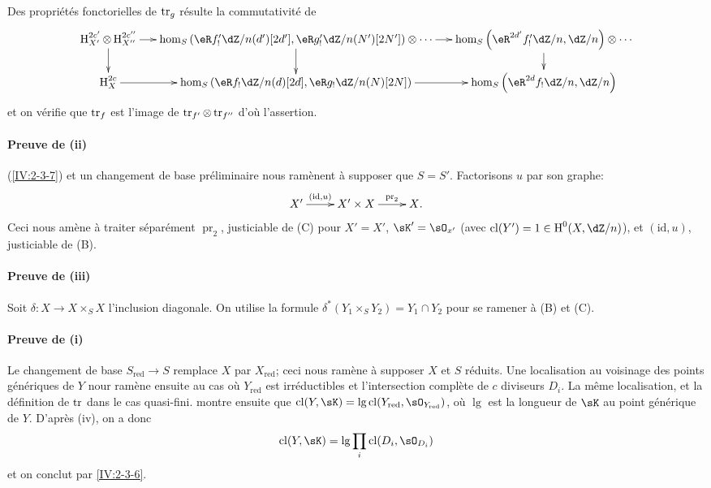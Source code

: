 Des propriétés fonctorielles de $\operatorname{tr}_g$ \cite[XVIII.2.12]{sga4} résulte 
la commutativité de 
\small
\[\xymatrix@=0.5cm{
  \h_{X'}^{2c'}\otimes \h_{X''}^{2 c''}\ar[r] \ar[d] 
    & \hom_S\left(\eR f_!' \dZ/n(d')[2 d'],\eR g_!'\dZ/n(N')[2 N']\right)\otimes \cdots \ar[r] \ar[d] 
    & \hom_S\left(\eR^{2 d'} f_!' \dZ/n,\dZ/n\right) \otimes \cdots \ar[d] \\
  \h_X^{2 c} \ar[r] 
    & \hom_S\left(\eR f_!\dZ/n(d)[2 d],\eR g_!\dZ/n(N)[2 N]\right) \ar[r] 
    & \hom_S\left(\eR^{2 d}f_!\dZ/n,\dZ/n\right)
}\]
\normalsize
et on vérifie que $\operatorname{tr}_f$ est l'image de $\operatorname{tr}_{f'}\otimes \operatorname{tr}_{f''}$ d'où 
l'assertion. 

\paragraph{Preuve de (ii)}
(\ref{IV:2-3-7}) et un changement de base préliminaire nous ramènent à 
supposer que $S=S'$. Factorisons $u$ par son graphe:
\[\xymatrix{
  X' \ar[r]^-{(\text{id},u)} 
    & X'\times X \ar[r]^-{\operatorname{pr}_2} 
    & X \text{.}
}\]
Ceci nous amène à traiter séparément $\operatorname{pr}_2$, justiciable 
de (C) pour $X'=X'$, $\sK'=\sO_{x'}$ (avec $\cl(Y')=1\in \h^0(X,\dZ/n)$), et 
$(\text{id},u)$, justiciable de (B). 

\paragraph{Preuve de (iii)}
Soit $\delta:X\to X\times_S X$ l'inclusion diagonale. On utilise la formule 
$\delta^\ast(Y_1\times_S Y_2) = Y_1\cap Y_2$ pour se ramener à 
(B) et (C). 

\paragraph{Preuve de (i)}
Le changement de base $S_\text{red}\to S$ remplace $X$ par $X_\text{red}$; ceci 
nous ramène à supposer $X$ et $S$ réduits. Une localisation au voisinage 
des points génériques de $Y$ nour ramène ensuite au cas où 
$Y_\text{red}$ est irréductibles et l'intersection complète de $c$ 
diviseurs $D_i$. La même localisation, et la définition de $\operatorname{tr}$ dans le 
cas quasi-fini. montre ensuite que 
$\cl(Y,\sK)=\operatorname{lg}\cl(Y_\text{red},\sO_{Y_\text{red}})$, où 
$\operatorname{lg}$ est la longueur de $\sK$ au point générique de $Y$. 
D'après (iv), on a donc 
\[
  \cl(Y,\sK) = \operatorname{lg} \prod_i \cl(D_i,\sO_{D_i})
\]
et on conclut par \ref{IV:2-3-6}. 





